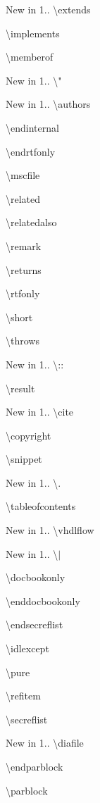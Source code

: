 \begin{DoxyDescription}
\item[New in 1.\+5.\+7]\textbackslash{}extends 
\item[]\textbackslash{}implements 
\item[]\textbackslash{}memberof 
\item[New in 1.\+6.\+2]\textbackslash{}"{} 
\item[New in 1.\+7.\+2]\textbackslash{}authors 
\item[]\textbackslash{}endinternal 
\item[]\textbackslash{}endrtfonly 
\item[]\textbackslash{}mscfile 
\item[]\textbackslash{}related 
\item[]\textbackslash{}relatedalso 
\item[]\textbackslash{}remark 
\item[]\textbackslash{}returns 
\item[]\textbackslash{}rtfonly 
\item[]\textbackslash{}short 
\item[]\textbackslash{}throws 
\item[New in 1.\+7.\+3]\textbackslash{}\+:: 
\item[]\textbackslash{}result 
\item[New in 1.\+7.\+5]\textbackslash{}cite 
\item[]\textbackslash{}copyright 
\item[]\textbackslash{}snippet 
\item[New in 1.\+8.\+0]\textbackslash{}. 
\item[]\textbackslash{}tableofcontents 
\item[New in 1.\+8.\+3]\textbackslash{}vhdlflow 
\item[New in 1.\+8.\+4]\textbackslash{}$\vert$ 
\item[]\textbackslash{}docbookonly 
\item[]\textbackslash{}enddocbookonly 
\item[]\textbackslash{}endsecreflist 
\item[]\textbackslash{}idlexcept 
\item[]\textbackslash{}pure 
\item[]\textbackslash{}refitem 
\item[]\textbackslash{}secreflist 
\item[New in 1.\+8.\+6]\textbackslash{}diafile 
\item[]\textbackslash{}endparblock 
\item[]\textbackslash{}parblock 

\end{DoxyDescription}
